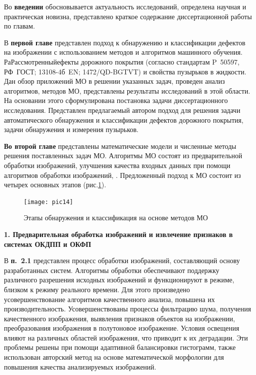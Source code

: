 Во \textbf{введении} обосновывается актуальность исследований, определена научная и практическая новизна, представлено краткое содержание диссертационной работы по главам.

В \textbf {первой главе} представлен подход к обнаружению и классификации дефектов на изображении с использованием методов и алгоритмов машинного обучения. РаРассмотренныйефекты дорожного покрытия (согласно стандартам P~50597, РФ~ГОСТ; 13108-4б~EN; 1472/QD-BGTVT) и свойства пузырьков в жидкости. Дан обзор приложений МО в решении указанных задач, проведен анализ алгоритмов, методов МО, представлены результаты исследований в этой области. На основании этого сформулирована постановка задачи диссертационного исследования. Представлен предлагаемый автором подход для решения задачи автоматического обнаружения и классификации дефектов дорожного покрытия, задачи обнаружения и измерения пузырьков.

 \textbf{Во второй главе} представлены математические модели и численные методы решения поставленных задач МО. Алгоритмы МО состоят из предварительной обработки изображений, улучшения качества входных данных при помощи алгоритмов обработки изображений, . Предложенный подход к МО состоит из четырех основных этапов (рис.\ref{pic14}).

\begin{figure}[ht!]
\centering
\texttt{[image: pic14]}
\caption{Этапы обнаружения и классификация на основе методов МО}
	\label{pic14}
	\end{figure}

\textbf{1. Предварительная обработка изображений и извлечение признаков в системах ОКДПП и ОКФП}

В \textbf{п.~2.1} представлен процесс обработки изображений, составляющий основу разработанных систем. Алгоритмы обработки обеспечивают поддержку различного разрешения исходных изображений и функционируют в режиме, близком к режиму реального времени. Для этого произведено усовершенствование алгоритмов качественного анализа, повышена их производительность. Усовершенствованы процессы фильтрацию шума, получения качественного изображения, выявления признаков объектов на изображении, преобразования изображения в полутоновое изображение. Условия освещения  влияют на  различных областей изображения, что приводит к их деградации. Эти проблемы решены при помощи адаптивной балансировки гистограмм, также использован авторский метод на основе математической морфологии для повышения качества анализируемых изображений.

